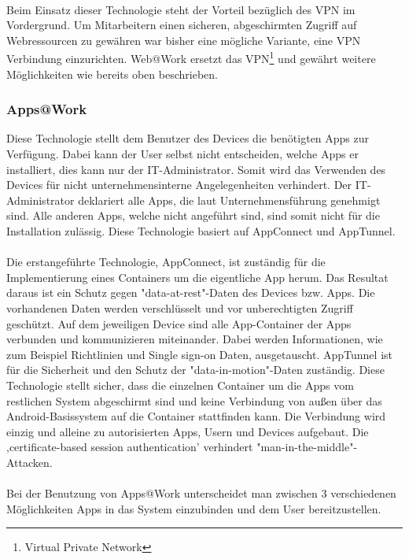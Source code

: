 \paragraph*{}
Beim Einsatz dieser Technologie steht der Vorteil bezüglich des VPN im Vordergrund. Um Mitarbeitern einen sicheren, abgeschirmten Zugriff auf Webressourcen zu gewähren war bisher eine mögliche Variante, eine VPN Verbindung einzurichten. Web@Work ersetzt das VPN\footnote{Virtual Private Network} und gewährt weitere Möglichkeiten wie bereits oben beschrieben.

\subsubsection{Apps@Work}
Diese Technologie stellt dem Benutzer des Devices die benötigten Apps zur Verfügung. Dabei kann der User selbst nicht entscheiden, welche Apps er installiert, dies kann nur der IT-Administrator. Somit wird das Verwenden des Devices für nicht unternehmensinterne Angelegenheiten verhindert. Der IT-Administrator deklariert alle Apps, die laut Unternehmensführung genehmigt sind. Alle anderen Apps, welche nicht angeführt sind, sind somit nicht für die Installation zulässig. Diese Technologie basiert auf AppConnect und AppTunnel.
\paragraph*{}
Die erstangeführte Technologie, AppConnect, ist zuständig für die Implementierung eines Containers um die eigentliche App herum. Das Resultat daraus ist ein Schutz gegen "data-at-rest"-Daten des Devices bzw. Apps. Die vorhandenen Daten werden verschlüsselt und vor unberechtigten Zugriff geschützt. Auf dem jeweiligen Device sind alle App-Container der Apps verbunden und kommunizieren miteinander. Dabei werden Informationen, wie zum Beispiel Richtlinien und Single sign-on Daten, ausgetauscht. \newline
AppTunnel ist für die Sicherheit und den Schutz der "data-in-motion"-Daten zuständig. Diese Technologie stellt sicher, dass die einzelnen Container um die Apps vom restlichen System abgeschirmt sind und keine Verbindung von außen über das Android-Basissystem auf die Container stattfinden kann. Die Verbindung wird einzig und alleine zu autorisierten Apps, Usern und Devices aufgebaut. Die ‚certificate-based session authentication’ verhindert "man-in-the-middle"-Attacken.
\paragraph*{}
Bei der Benutzung von Apps@Work unterscheidet man zwischen 3 verschiedenen Möglichkeiten Apps in das System einzubinden und dem User bereitzustellen.
